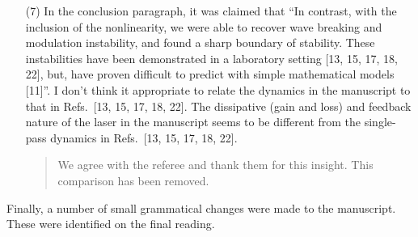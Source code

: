 \documentclass[12pt,twoside,letterpaper]{article}
\begin{document}
\begin{itemize}
    \item[{(7)}]
    In the conclusion paragraph, it was claimed that ``In contrast, with the inclusion of the nonlinearity, we were able to recover wave breaking and modulation instability, and found a sharp boundary of stability. These instabilities have been demonstrated in a laboratory setting [13, 15, 17, 18, 22], but, have proven difficult to predict with simple mathematical models [11]''. I don't think it appropriate to relate the dynamics in the manuscript to that in Refs.~[13, 15, 17, 18, 22]. The dissipative (gain and loss) and feedback nature of the laser in the manuscript seems to be different from the single-pass dynamics in Refs.~[13, 15, 17, 18, 22].

    \begin{quote}
        We agree with the referee and thank them for this insight. This comparison has been removed.
    \end{quote}
\end{itemize}

Finally, a number of small grammatical changes were made to the manuscript. These were
identified on the final reading.
\end{document}
